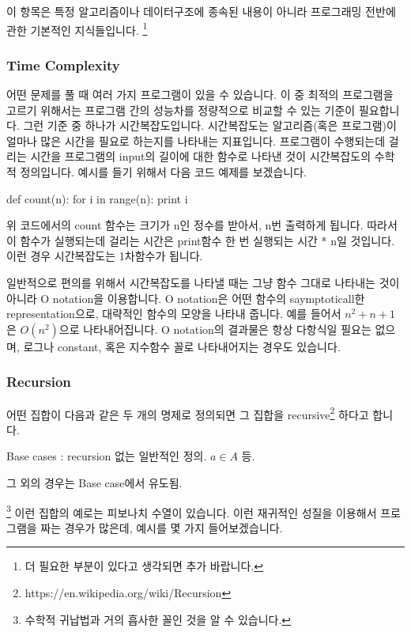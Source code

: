 이 항목은 특정 알고리즘이나 데이터구조에 종속된 내용이 아니라 프로그래밍 전반에 관한 기본적인 지식들입니다. \footnote{더 필요한 부분이 있다고 생각되면 추가 바랍니다.} 

\subsubsection{Time Complexity} 

어떤 문제를 풀 때 여러 가지 프로그램이 있을 수 있습니다. 이 중 최적의 프로그램을 고르기 위해서는 프로그램 간의 성능차를 정량적으로 비교할 수 있는 기준이 필요합니다. 그런 기준 중 하나가 시간복잡도입니다. 시간복잡도는 알고리즘(혹은 프로그램)이 얼마나 많은 시간을 필요로 하는지를 나타내는 지표입니다. 프로그램이 수행되는데 걸리는 시간을 프로그램의 input의 길이에 대한 함수로 나타낸 것이 시간복잡도의 수학적 정의입니다. 예시를 들기 위해서 다음 코드 예제를 보겠습니다. 

\begin{Python}
def count(n):
	for i in range(n):
		print i
\end{Python}

위 코드에서의 count 함수는 크기가 n인 정수를 받아서, n번 출력하게 됩니다. 따라서 이 함수가 실행되는데 걸리는 시간은 print함수 한 번 실행되는 시간 * n일 것입니다. 이런 경우 시간복잡도는 1차함수가 됩니다. 

일반적으로 편의를 위해서 시간복잡도를 나타낼 때는 그냥 함수 그대로 나타내는 것이 아니라 O notation을 이용합니다. O notation은 어떤 함수의 saymptoticall한 representation으로, 대략적인 함수의 모양을 나타내 줍니다. 예를 들어서 $n^2+n+1$은 $O(n^2
)$으로 나타내어집니다. O notation의 결과물은 항상 다항식일 필요는 없으며, 로그나 constant, 혹은 지수함수 꼴로 나타내어지는 경우도 있습니다. 

\subsubsection{Recursion}

어떤 집합이 다음과 같은 두 개의 명제로 정의되면 그 집합을 recursive\footnote{https://en.wikipedia.org/wiki/Recursion } 하다고 합니다. 
\begin{compactitem}
\item Base cases : recursion 없는 일반적인 정의. $a \in A$ 등. 
\item 그 외의 경우는 Base case에서 유도됨. 
\end{compactitem}
\footnote{수학적 귀납법과 거의 흡사한 꼴인 것을 알 수 있습니다.}
이런 집합의 예로는 피보나치 수열이 있습니다. 이런 재귀적인 성질을 이용해서 프로그램을 짜는 경우가 많은데, 예시를 몇 가지 들어보겠습니다. 


